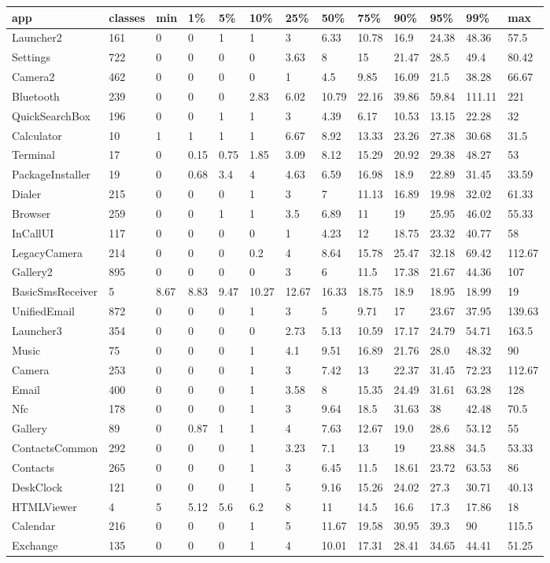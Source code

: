 \begin{tabular}{|l|l|l|l|l|l|l|l|l|l|l|l|l|}
\hline
app&classes&min&1\%&5\%&10\%&25\%&50\%&75\%&90\%&95\%&99\%&max\\
\hline
Launcher2&161&0&0&1&1&3&6.33&10.78&16.9&24.38&48.36&57.5\\
\hline
Settings&722&0&0&0&0&3.63&8&15&21.47&28.5&49.4&80.42\\
\hline
Camera2&462&0&0&0&0&1&4.5&9.85&16.09&21.5&38.28&66.67\\
\hline
Bluetooth&239&0&0&0&2.83&6.02&10.79&22.16&39.86&59.84&111.11&221\\
\hline
QuickSearchBox&196&0&0&1&1&3&4.39&6.17&10.53&13.15&22.28&32\\
\hline
Calculator&10&1&1&1&1&6.67&8.92&13.33&23.26&27.38&30.68&31.5\\
\hline
Terminal&17&0&0.15&0.75&1.85&3.09&8.12&15.29&20.92&29.38&48.27&53\\
\hline
PackageInstaller&19&0&0.68&3.4&4&4.63&6.59&16.98&18.9&22.89&31.45&33.59\\
\hline
Dialer&215&0&0&0&1&3&7&11.13&16.89&19.98&32.02&61.33\\
\hline
Browser&259&0&0&1&1&3.5&6.89&11&19&25.95&46.02&55.33\\
\hline
InCallUI&117&0&0&0&0&1&4.23&12&18.75&23.32&40.77&58\\
\hline
LegacyCamera&214&0&0&0&0.2&4&8.64&15.78&25.47&32.18&69.42&112.67\\
\hline
Gallery2&895&0&0&0&0&3&6&11.5&17.38&21.67&44.36&107\\
\hline
BasicSmsReceiver&5&8.67&8.83&9.47&10.27&12.67&16.33&18.75&18.9&18.95&18.99&19\\
\hline
UnifiedEmail&872&0&0&0&1&3&5&9.71&17&23.67&37.95&139.63\\
\hline
Launcher3&354&0&0&0&0&2.73&5.13&10.59&17.17&24.79&54.71&163.5\\
\hline
Music&75&0&0&0&1&4.1&9.51&16.89&21.76&28.0&48.32&90\\
\hline
Camera&253&0&0&0&1&3&7.42&13&22.37&31.45&72.23&112.67\\
\hline
Email&400&0&0&0&1&3.58&8&15.35&24.49&31.61&63.28&128\\
\hline
Nfc&178&0&0&0&1&3&9.64&18.5&31.63&38&42.48&70.5\\
\hline
Gallery&89&0&0.87&1&1&4&7.63&12.67&19.0&28.6&53.12&55\\
\hline
ContactsCommon&292&0&0&0&1&3.23&7.1&13&19&23.88&34.5&53.33\\
\hline
Contacts&265&0&0&0&1&3&6.45&11.5&18.61&23.72&63.53&86\\
\hline
DeskClock&121&0&0&0&1&5&9.16&15.26&24.02&27.3&30.71&40.13\\
\hline
HTMLViewer&4&5&5.12&5.6&6.2&8&11&14.5&16.6&17.3&17.86&18\\
\hline
Calendar&216&0&0&0&1&5&11.67&19.58&30.95&39.3&90&115.5\\
\hline
Exchange&135&0&0&0&1&4&10.01&17.31&28.41&34.65&44.41&51.25\\
\hline
\end{tabular}
